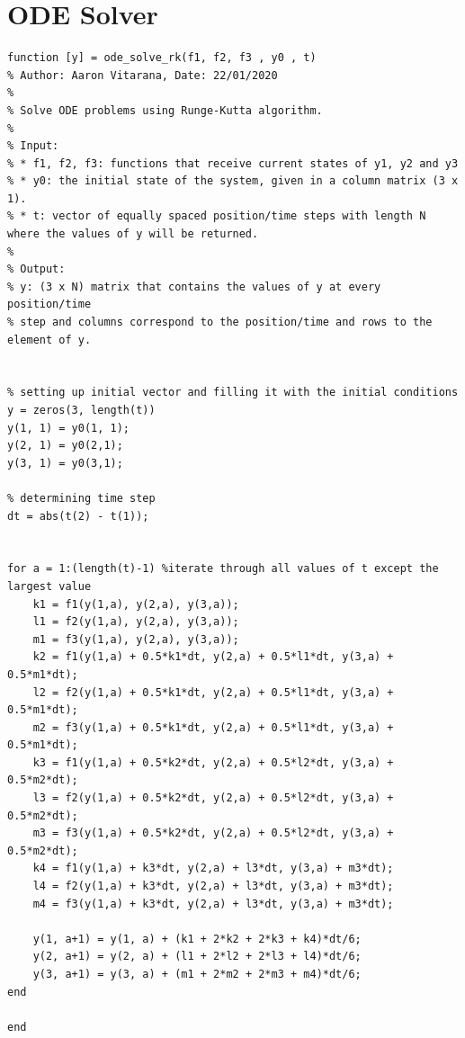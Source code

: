 \documentclass[a4paper,11pt]{article}
\begin{document}
\clearpage





\appendix
\renewcommand\thesection{Appendix \Alph{section}}

\section{ODE Solver}
\begin{lstlisting}
function [y] = ode_solve_rk(f1, f2, f3 , y0 , t)
% Author: Aaron Vitarana, Date: 22/01/2020
%
% Solve ODE problems using Runge-Kutta algorithm.
% 
% Input:
% * f1, f2, f3: functions that receive current states of y1, y2 and y3
% * y0: the initial state of the system, given in a column matrix (3 x 1).
% * t: vector of equally spaced position/time steps with length N where the values of y will be returned.
%
% Output:
% y: (3 x N) matrix that contains the values of y at every position/time
% step and columns correspond to the position/time and rows to the element of y.


% setting up initial vector and filling it with the initial conditions
y = zeros(3, length(t))
y(1, 1) = y0(1, 1); 
y(2, 1) = y0(2,1);
y(3, 1) = y0(3,1);

% determining time step
dt = abs(t(2) - t(1));

    
for a = 1:(length(t)-1) %iterate through all values of t except the largest value
    k1 = f1(y(1,a), y(2,a), y(3,a));
    l1 = f2(y(1,a), y(2,a), y(3,a));
    m1 = f3(y(1,a), y(2,a), y(3,a));
    k2 = f1(y(1,a) + 0.5*k1*dt, y(2,a) + 0.5*l1*dt, y(3,a) + 0.5*m1*dt);
    l2 = f2(y(1,a) + 0.5*k1*dt, y(2,a) + 0.5*l1*dt, y(3,a) + 0.5*m1*dt);
    m2 = f3(y(1,a) + 0.5*k1*dt, y(2,a) + 0.5*l1*dt, y(3,a) + 0.5*m1*dt);
    k3 = f1(y(1,a) + 0.5*k2*dt, y(2,a) + 0.5*l2*dt, y(3,a) + 0.5*m2*dt);
    l3 = f2(y(1,a) + 0.5*k2*dt, y(2,a) + 0.5*l2*dt, y(3,a) + 0.5*m2*dt);
    m3 = f3(y(1,a) + 0.5*k2*dt, y(2,a) + 0.5*l2*dt, y(3,a) + 0.5*m2*dt);
    k4 = f1(y(1,a) + k3*dt, y(2,a) + l3*dt, y(3,a) + m3*dt);
    l4 = f2(y(1,a) + k3*dt, y(2,a) + l3*dt, y(3,a) + m3*dt);
    m4 = f3(y(1,a) + k3*dt, y(2,a) + l3*dt, y(3,a) + m3*dt);
    
    y(1, a+1) = y(1, a) + (k1 + 2*k2 + 2*k3 + k4)*dt/6;
    y(2, a+1) = y(2, a) + (l1 + 2*l2 + 2*l3 + l4)*dt/6;
    y(3, a+1) = y(3, a) + (m1 + 2*m2 + 2*m3 + m4)*dt/6;
end

end
\end{lstlisting}

\clearpage
\end{document}
